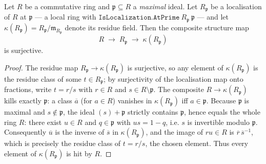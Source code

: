\begin{lemma}

  \label{lem:algebraMap_residueField_surjective}
  Let \(R\) be a commutative ring and \(\mathfrak p \subseteq R\) a
  \emph{maximal} ideal. Let \(R_{\mathfrak p}\) be a localisation of \(R\) at
  \(\mathfrak p\) --- a local ring with
  \(\texttt{IsLocalization.AtPrime}\ R_{\mathfrak p}\ \mathfrak p\) --- and let
  \(\kappa(R_{\mathfrak p}) = R_{\mathfrak p} / \mathfrak m_{R_{\mathfrak p}}\)
  denote its residue field. Then the composite structure map
  \[
    R \;\longrightarrow\; R_{\mathfrak p} \;\longrightarrow\;
    \kappa(R_{\mathfrak p})
  \]
  is surjective.
\end{lemma}

\begin{proof}
  \leanok
  The residue map \(R_{\mathfrak p} \to \kappa(R_{\mathfrak p})\) is surjective, so any element of
  \(\kappa(R_{\mathfrak p})\) is the residue class of some
  \(t \in R_{\mathfrak p}\); by surjectivity of the localisation map onto
  fractions, write \(t = r / s\) with \(r \in R\) and \(s \in R \setminus
  \mathfrak p\). The composite \(R \to \kappa(R_{\mathfrak p})\) kills exactly
  \(\mathfrak p\): a class \(\overline{a}\) (for \(a \in R\)) vanishes in
  \(\kappa(R_{\mathfrak p})\) iff \(a \in \mathfrak p\).
  Because \(\mathfrak p\) is maximal and
  \(s \notin \mathfrak p\), the ideal \((s) + \mathfrak p\) strictly contains
  \(\mathfrak p\), hence equals the whole ring \(R\):
  there exist \(u \in R\) and \(q \in \mathfrak p\) with \(u s = 1 - q\), i.e.
  \(s\) is invertible modulo \(\mathfrak p\).
  Consequently \(\overline{u}\) is the inverse of \(\overline{s}\) in
  \(\kappa(R_{\mathfrak p})\), and the image of \(r u \in R\) is
  \(\overline{r}\,\overline{s}^{-1}\), which is precisely the residue class of
  \(t = r/s\), the chosen element. Thus every element of
  \(\kappa(R_{\mathfrak p})\) is hit by \(R\).
\end{proof}

